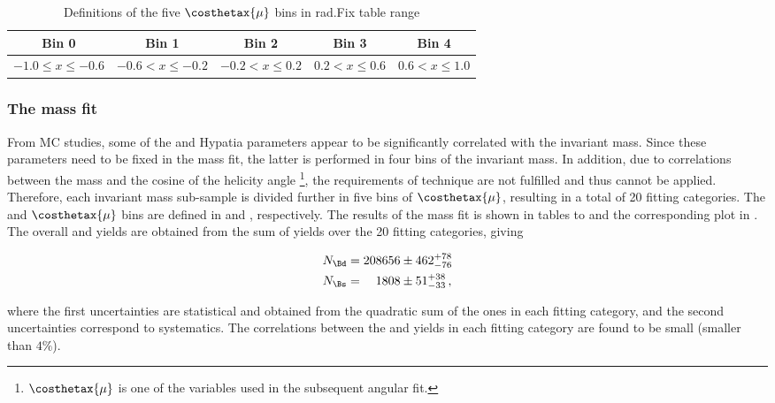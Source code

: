 \begin{table}[!h]
\begin{tabular}{c|c|c|c|c}
\hline
 Bin 0 & Bin 1 & Bin 2 & Bin 3 & Bin 4\\	
\hline
\multirow{2}{*}{$ -1.0 \leq x \leq -0.6 $} & \multirow{2}{*}{$ -0.6 < x \leq -0.2 $} & \multirow{2}{*}{$ -0.2 < x \leq 0.2 $}& \multirow{2}{*}{$ 0.2 < x \leq 0.6 $} & \multirow{2}{*}{$ 0.6 < x \leq 1.0 $} \\
					      	 					  &   &	& & \\	
\hline
 \end{tabular}
\caption{Definitions of the five $\costhetax{\mu}$ bins in rad.{\color{red}Fix table range}}
\label{cosThateMubindef} 
\end{table}

\subsubsection{The mass fit}
From MC studies, some of the \Bs and \Bd Hypatia parameters appear to be significantly correlated with the \mkpi invariant mass. 
Since these parameters need to be fixed in the mass fit, the latter is performed in four bins of the
\mkpi invariant mass. In addition, due to correlations between the mass and the cosine of the helicity angle \thetamu\footnote{$\costhetax{\mu}$ is one of 
the variables used in the subsequent angular fit.},
the requirements of \sPlot technique are not fulfilled and thus cannot be applied. Therefore, each \mkpi invariant mass sub-sample
is divided further in five bins of $\costhetax{\mu}$, resulting in a total of 20 fitting categories. The \mkpi and $\costhetax{\mu}$ bins are defined 
in  and , respectively. The results of the mass fit is shown in tables 
to  and the corresponding plot in . The overall \Bs and \Bd yields are obtained from the sum 
of yields over the 20 fitting categories, giving

\begin{align}
N_{\Bd} &= 208656  \pm  462 ^{+ 78	}_{- 76}\\
N_{\Bs} &= \phantom{00}1808  \pm   51 ^{+ 38	}_{- 33} \, ,
\end{align}

\noindent where the first uncertainties are statistical and obtained from the quadratic sum of the ones in each fitting category, 
and the second uncertainties correspond to systematics. The correlations between the \Bd and \Bs yields in each fitting category
are found to be small (smaller than $4\%$).

